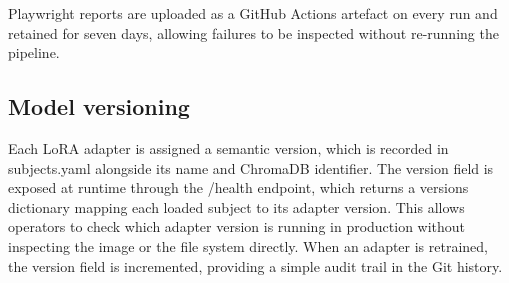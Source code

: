 Playwright reports are uploaded as a GitHub Actions artefact on every run and retained for seven days, allowing failures to be inspected without re-running the pipeline.

\subsection{Model versioning}

Each LoRA adapter is assigned a semantic version, which is recorded in subjects.yaml alongside its name and ChromaDB identifier. The version field is exposed at runtime through the /health endpoint, which returns a versions dictionary mapping each loaded subject to its adapter version. This allows operators to check which adapter version is running in production without inspecting the image or the file system directly. When an adapter is retrained, the version field is incremented, providing a simple audit trail in the Git history.

